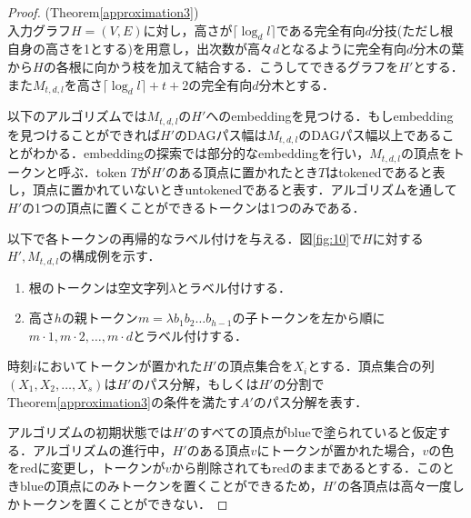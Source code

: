 \documentclass[master]{kuisthesis}		%
\theoremstyle{plain}
\theoremstyle{definition}
\begin{document}
\begin{proof}(Theorem\ref{approximation3})\\
入力グラフ$H = (V, E)$に対し，高さが$\lceil \log_d l \rceil$である完全有向$d$分技(ただし根自身の高さを1とする)を用意し，出次数が高々$d$となるように完全有向$d$分木の葉から$H$の各根に向かう枝を加えて結合する．こうしてできるグラフを$H'$とする．また$M_{t, d, l}$を高さ$\lceil \log_d l \rceil +t+2$の完全有向$d$分木とする．

以下のアルゴリズムでは$M_{t, d, l}$の$H'$へのembeddingを見つける．もしembeddingを見つけることができれば$H'$のDAGパス幅は$M_{t, d, l}$のDAGパス幅以上であることがわかる．embeddingの探索では部分的なembeddingを行い，$M_{t, d, l}$の頂点をトークンと呼ぶ．token $T$が$H'$のある頂点に置かれたとき$T$はtokenedであると表し，頂点に置かれていないときuntokenedであると表す．アルゴリズムを通して$H'$の1つの頂点に置くことができるトークンは1つのみである．

以下で各トークンの再帰的なラベル付けを与える．図\ref{fig:10}で$H$に対する$H', M_{t, d, l}$の構成例を示す．

\begin{enumerate}
    \item 根のトークンは空文字列$\lambda$とラベル付けする．
    \item 高さ$h$の親トークン$m=\lambda b_1 b_2 \dots b_{h-1}$の子トークンを左から順に$m \cdot 1, m \cdot 2, \dots , m \cdot d$とラベル付けする．
\end{enumerate}

時刻$i$においてトークンが置かれた$H'$の頂点集合を$X_i$とする．頂点集合の列$(X_1, X_2, \dots, X_s)$は$H'$のパス分解，もしくは$H'$の分割でTheorem\ref{approximation3}の条件を満たす$A'$のパス分解を表す．


アルゴリズムの初期状態では$H'$のすべての頂点がblueで塗られていると仮定する．アルゴリズムの進行中，$H'$のある頂点$v$にトークンが置かれた場合，$v$の色をredに変更し，トークンが$v$から削除されてもredのままであるとする．このときblueの頂点にのみトークンを置くことができるため，$H'$の各頂点は高々一度しかトークンを置くことができない．







\end{proof}
\end{document}
